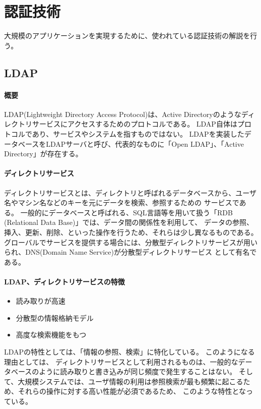 \documentclass[12pt,a4paper,titlepage]{jreport}
\begin{document}
\chapter{認証技術}
大規模のアプリケーションを実現するために、使われている認証技術の解説を行う。
\section{LDAP}
\subsubsection*{概要}
LDAP(Lightweight Directory Access Protocol)は、Active Directoryのようなディレクトリサービスにアクセスするためのプロトコルである。
LDAP自体はプロトコルであり、サービスやシステムを指すものではない。
LDAPを実装したデータベースをLDAPサーバと呼び、代表的なものに「Open LDAP」、「Active Directory」が存在する。\par
\subsubsection*{ディレクトリサービス}
ディレクトリサービスとは、ディレクトリと呼ばれるデータベースから、ユーザ名やマシン名などのキーを元にデータを検索、参照するための
サービスである。
一般的にデータベースと呼ばれる、SQL言語等を用いて扱う「RDB (Relational Data Base)」では、データ間の関係性を利用して、
データの参照、挿入、更新、削除、といった操作を行うため、それらは少し異なるものである。
グローバルでサービスを提供する場合には、分散型ディレクトリサービスが用いられ、DNS(Domain Name Service)が分散型ディレクトリサービス
として有名である。

\subsubsection*{LDAP、ディレクトリサービスの特徴}

\begin{itemize}
    \item 読み取りが高速
    \item 分散型の情報格納モデル
    \item 高度な検索機能をもつ
\end{itemize}

LDAPの特性としては、「情報の参照、検索」に特化している。
このようになる理由としては、
ディレクトリサービスとして利用されるものは、一般的なデータベースのように読み取りと書き込みが同じ頻度で発生することはない。
そして、大規模システムでは、ユーザ情報の利用は参照検索が最も頻繁に起こるため、それらの操作に対する高い性能が必須であるため、
このような特性となっている。
\end{document}
